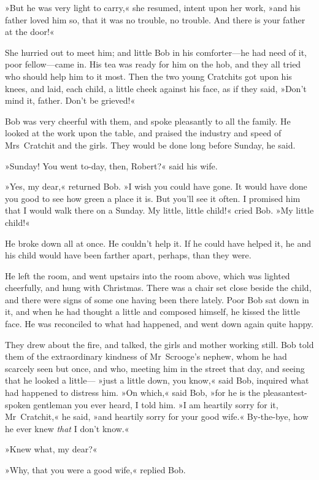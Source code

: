 »But he was very light to carry,« she resumed, intent upon her work, »and his father loved him so, that it was no trouble, no trouble. And there is your father at the door!«

She hurried out to meet him; and little Bob in his comforter---he had need of it, poor fellow---came in. His tea was ready for him on the hob, and they all tried who should help him to it most. Then the two young Cratchits got upon his knees, and laid, each child, a little cheek against his face, as if they said, »Don't mind it, father. Don't be grieved!«

Bob was very cheerful with them, and spoke pleasantly to all the family. He looked at the work upon the table, and praised the industry and speed of Mrs~Cratchit and the girls. They would be done long before Sunday, he said.

»Sunday! You went to-day, then, Robert?« said his wife.

»Yes, my dear,« returned Bob. »I wish you could have gone. It would have done you good to see how green a place it is. But you'll see it often. I promised him that I would walk there on a Sunday. My little, little child!« cried Bob. »My little child!«

He broke down all at once. He couldn't help it. If he could have helped it, he and his child would have been farther apart, perhaps, than they were.

He left the room, and went upstairs into the room above, which was lighted cheerfully, and hung with Christmas. There was a chair set close beside the child, and there were signs of some one having been there lately. Poor Bob sat down in it, and when he had thought a little and composed himself, he kissed the little face. He was reconciled to what had happened, and went down again quite happy.

They drew about the fire, and talked, the girls and mother working still. Bob told them of the extraordinary kindness of Mr~Scrooge's nephew, whom he had scarcely seen but once, and who, meeting him in the street that day, and seeing that he looked a little--- »just a little down, you know,« said Bob, inquired what had happened to distress him. »On which,« said Bob, »for he is the pleasantest-spoken gentleman you ever heard, I told him. »I am heartily sorry for it, Mr~Cratchit,« he said, »and heartily sorry for your good wife.« By-the-bye, how he ever knew \textit{that} I don't know.«

»Knew what, my dear?«

»Why, that you were a good wife,« replied Bob.

